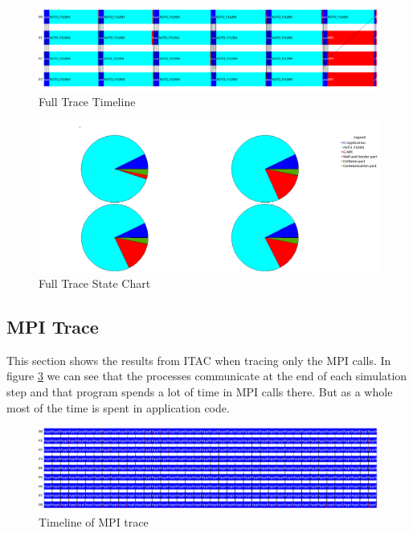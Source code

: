\documentclass[a4paper, 12pt]{article}
\begin{document}
\begin{figure}[h]
        \centering
        \includegraphics[width=\textwidth]{event_timeline_loop_state.png}
        \caption{Full Trace Timeline}
        \label{fig:ftt}
\end{figure}

\begin{figure}[h]
        \centering
        \includegraphics[width=\textwidth]{loop_state_chart.png}
        \caption{Full Trace State Chart}
        \label{fig:ftsc}
\end{figure}
\subsection{MPI Trace}
This section shows the results from ITAC when tracing only the MPI calls.
In figure \ref{fig:mtt} we can see that the processes communicate at the end of
each simulation step and that program spends a lot of time in MPI calls there.
But as a whole most of the time is spent in application code.
\begin{figure}[h]
        \centering
        \includegraphics[width=\textwidth]{event_timeline.png}
        \caption{Timeline of MPI trace}
        \label{fig:mtt}
\end{figure}
\end{document}
